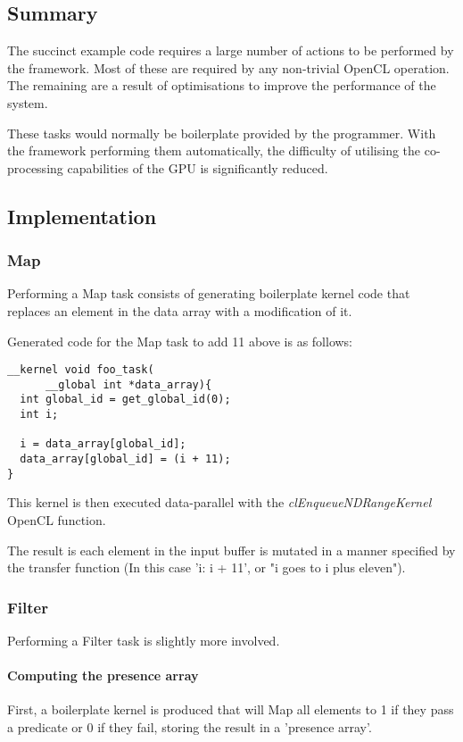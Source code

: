   \subsection{Summary}

  The succinct example code requires a large number of actions to be performed by the framework. Most of these are required by any non-trivial OpenCL operation. The remaining are a result of optimisations to improve the performance of the system.

  These tasks would normally be boilerplate provided by the programmer. With the framework performing them automatically, the difficulty of utilising the co-processing capabilities of the GPU is significantly reduced.

  \subsection{Implementation}
  \subsubsection{Map}
    Performing a Map task consists of generating boilerplate kernel code that replaces an element in the data array with a modification of it.

    Generated code for the Map task to add 11 above is as follows:
    \begin{verbatim}
__kernel void foo_task(
      __global int *data_array){
  int global_id = get_global_id(0);
  int i;

  i = data_array[global_id];
  data_array[global_id] = (i + 11);
}
    \end{verbatim}
    This kernel is then executed data-parallel with the \emph{clEnqueueNDRangeKernel} OpenCL function.

    The result is each element in the input buffer is mutated in a manner specified by the transfer function (In this case 'i: i + 11', or "i goes to i plus eleven").

  \subsubsection{Filter}
    Performing a Filter task is slightly more involved.

    \paragraph{Computing the presence array}
    First, a boilerplate kernel is produced that will Map all elements to 1 if they pass a predicate or 0 if they fail, storing the result in a 'presence array'.

